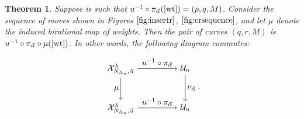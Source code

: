 \documentclass[10pt,a4paper]{amsart}
\numberwithin{equation}{section}
\newtheorem{Theorem}{Theorem}[section]
\newcommand{\wt}{{\rm wt}}
\begin{document}
	\begin{Theorem}
		\label{thm:crdynamicslocalmoves}
		Suppose \smash{$[\wt] \in \mathcal X_{N_{\Delta_n},\vec \alpha}^\lambda$} is such that $u^{-1} \circ \pi_{\vec \alpha} ([\wt])=(p,q,M)$. Consider the sequence of moves shown in Figures $\ref{fig:insertr}$, $\ref{fig:crsequence}$, and let $\mu$ denote the induced birational map of weights. Then the pair of curves $(q,r,M)$ is $u^{-1} \circ \pi_{\vec \alpha} \circ \mu ([\wt])$.	In other words, the following diagram commutes:
		
		\[
		{\begin{tikzcd}[every label/.append style = {font = \normalsize}, row sep=large, column sep = huge]
				\mathcal X_{N_{\Delta_n},\vec \alpha}^\lambda \arrow[r, "u^{-1} \circ \pi_{\vec \alpha}"] \arrow[d, "\mu"']
				& \mathcal U_n \arrow[d, "\nu_{\vec \alpha}"] \\
				\mathcal X_{N_{\Delta_n},\vec \alpha}^\lambda \arrow[r,"u^{-1} \circ \pi_{\vec \alpha}"]
				& \mathcal U_n
		\end{tikzcd}}.
		\]
\end{Theorem}
	
\end{document}
